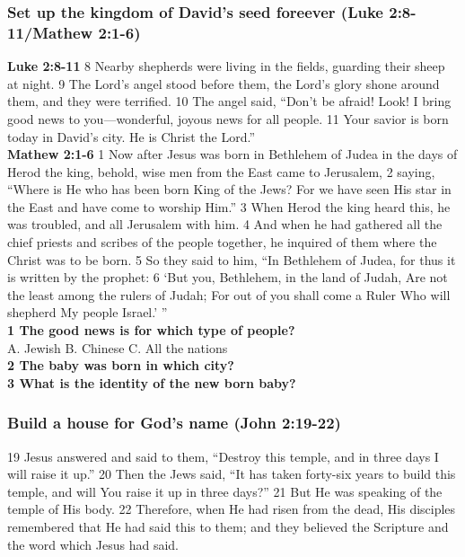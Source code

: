 \subsubsection{Set up the kingdom of David's seed foreever (Luke 2:8-11/Mathew 2:1-6)}
\textbf{Luke 2:8-11} 8 Nearby shepherds were living in the fields, guarding their sheep at night. 9 The Lord’s angel stood before them, the Lord’s glory shone around them, and they were terrified. 10 The angel said, “Don’t be afraid! Look! I bring good news to you—wonderful, joyous news for all people. 11 Your savior is born today in David’s city. He is Christ the Lord.”\\
\textbf{Mathew 2:1-6} 1 Now after Jesus was born in Bethlehem of Judea in the days of Herod the king, behold, wise men from the East came to Jerusalem, 2 saying, “Where is He who has been born King of the Jews? For we have seen His star in the East and have come to worship Him.”
3 When Herod the king heard this, he was troubled, and all Jerusalem with him. 4 And when he had gathered all the chief priests and scribes of the people together, he inquired of them where the Christ was to be born.
5 So they said to him, “In Bethlehem of Judea, for thus it is written by the prophet:
6 ‘But you, Bethlehem, in the land of Judah,
Are not the least among the rulers of Judah;
For out of you shall come a Ruler
Who will shepherd My people Israel.’ ”\\

\textbf{1 The good news is for which type of people?}\\
A. Jewish \hspace{1cm} B. Chinese \hspace{1cm} C. All the nations\\
\textbf{2 The baby was born in which city?}\\
\textbf{3 What is the identity of the new born baby?}\\

\subsubsection{Build a house for God's name (John 2:19-22)}
19 Jesus answered and said to them, “Destroy this temple, and in three days I will raise it up.”
20 Then the Jews said, “It has taken forty-six years to build this temple, and will You raise it up in three days?”
21 But He was speaking of the temple of His body. 22 Therefore, when He had risen from the dead, His disciples remembered that He had said this to them; and they believed the Scripture and the word which Jesus had said.\\

